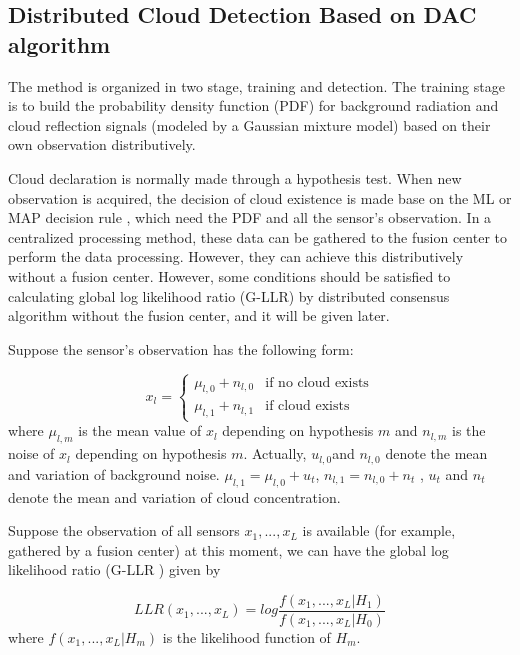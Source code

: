 \subsection{\label{sub:Distributed-Cloud-Declaration}Distributed Cloud Detection
Based on DAC algorithm}

The method is organized in two stage, training and detection. The
training stage is to build the probability density function (PDF)
for background radiation and cloud reflection signals (modeled by
a Gaussian mixture model) based on their own observation distributively.

Cloud declaration is normally made through a hypothesis test. When
new observation is acquired, the decision of cloud existence is made
base on the ML or MAP decision rule \cite{Chair1986}, which need
the PDF and all the sensor\textquoteright{}s observation. In a centralized
processing method, these data can be gathered to the fusion center
to perform the data processing. However, they can achieve this distributively
without a fusion center. However, some conditions should be satisfied
to calculating global log likelihood ratio (G-LLR) by distributed
consensus algorithm without the fusion center, and it will be given
later.

Suppose the sensor's observation has the following form:

\begin{equation}
x_{l}=\begin{cases}
\mu_{l,0}+n_{l,0} & \mbox{if no cloud exists}\\
\mu_{l,1}+n_{l,1} & \mbox{if cloud exists}
\end{cases}\label{eq:Cloud signal model}
\end{equation}
where $\mu_{l,m}$ is the mean value of $x_{l}$ depending on hypothesis
$m$ and $n_{l,m}$ is the noise of $x_{l}$ depending on hypothesis
$m$. Actually, $u_{l,0}$and $n_{l,0}$ denote the mean and variation
of background noise. $\mu_{l,1}=\mu_{l,0}+u_{t}$, $n_{l,1}=n_{l,0}+n_{t}$
, $u_{t}$ and $n_{t}$ denote the mean and variation of cloud concentration. 

Suppose the observation of all sensors $x_{1},...,x_{L}$ is available
(for example, gathered by a fusion center) at this moment, we can
have the global log likelihood ratio (G-LLR ) given by

\begin{equation}
LLR(x_{1},...,x_{L})=log\frac{f\left(x_{1},...,x_{L}|H_{1}\right)}{f\left(x_{1},...,x_{L}|H_{0}\right)}\label{eq:G-LLR define Cloud}
\end{equation}
where $f\left(x_{1},...,x_{L}|H_{m}\right)$ is the likelihood function
of $H_{m}$. 

